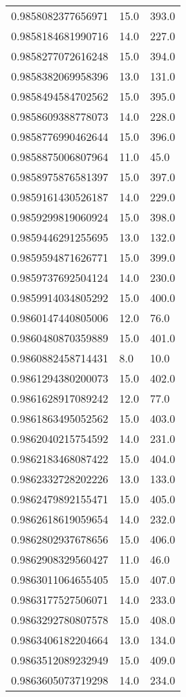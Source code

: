 \begin{center}
\begin{supertabular}[H]{p{0.30\textwidth}p{0.05\textwidth}p{0.05\textwidth}}
0.9858082377656971 & 15.0 & 393.0 \\ 
0.9858184681990716 & 14.0 & 227.0 \\ 
0.9858277072616248 & 15.0 & 394.0 \\ 
0.9858382069958396 & 13.0 & 131.0 \\ 
0.9858494584702562 & 15.0 & 395.0 \\ 
0.9858609388778073 & 14.0 & 228.0 \\ 
0.9858776990462644 & 15.0 & 396.0 \\ 
0.9858875006807964 & 11.0 & 45.0 \\ 
0.9858975876581397 & 15.0 & 397.0 \\ 
0.9859161430526187 & 14.0 & 229.0 \\ 
0.9859299819060924 & 15.0 & 398.0 \\ 
0.9859446291255695 & 13.0 & 132.0 \\ 
0.9859594871626771 & 15.0 & 399.0 \\ 
0.9859737692504124 & 14.0 & 230.0 \\ 
0.9859914034805292 & 15.0 & 400.0 \\ 
0.9860147440805006 & 12.0 & 76.0 \\ 
0.9860480870359889 & 15.0 & 401.0 \\ 
0.9860882458714431 & 8.0 & 10.0 \\ 
0.9861294380200073 & 15.0 & 402.0 \\ 
0.9861628917089242 & 12.0 & 77.0 \\ 
0.9861863495052562 & 15.0 & 403.0 \\ 
0.9862040215754592 & 14.0 & 231.0 \\ 
0.9862183468087422 & 15.0 & 404.0 \\ 
0.9862332728202226 & 13.0 & 133.0 \\ 
0.9862479892155471 & 15.0 & 405.0 \\ 
0.9862618619059654 & 14.0 & 232.0 \\ 
0.9862802937678656 & 15.0 & 406.0 \\ 
0.9862908329560427 & 11.0 & 46.0 \\ 
0.9863011064655405 & 15.0 & 407.0 \\ 
0.9863177527506071 & 14.0 & 233.0 \\ 
0.9863292780807578 & 15.0 & 408.0 \\ 
0.9863406182204664 & 13.0 & 134.0 \\ 
0.9863512089232949 & 15.0 & 409.0 \\ 
0.9863605073719298 & 14.0 & 234.0 \\ 

\end{supertabular}
\end{center}
